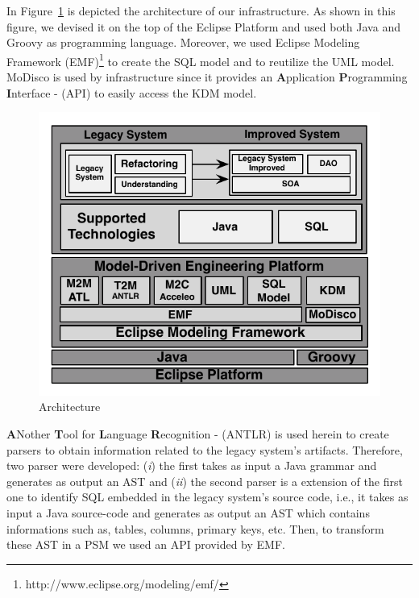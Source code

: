 
In Figure~\ref{fig:architecture} is depicted the architecture of our infrastructure. As shown in this figure, we devised it on the top of the Eclipse Platform and used both Java and Groovy as programming language. Moreover, we used Eclipse Modeling Framework (EMF)\footnote{http://www.eclipse.org/modeling/emf/} to create the SQL model and to reutilize the UML model. MoDisco is used by infrastructure since it provides an
\textbf{A}pplication \textbf{P}rogramming \textbf{I}nterface - (API) to easily access the KDM model. 

\begin{figure}[!h]
\centering
 \includegraphics[scale=0.8]{Figuras/Arquitetura_da_Ferramenta}
\caption{Architecture}
\label{fig:architecture}
\end{figure}



\textbf{A}Nother \textbf{T}ool for \textbf{L}anguage \textbf{R}ecognition -  (ANTLR) is used herein to create parsers to obtain information related to the legacy system's artifacts. Therefore, two parser were developed: (\textit{i}) the first takes as input a Java grammar and generates as output an AST and (\textit{ii}) the second parser is a extension of the first one to identify SQL embedded in the legacy system's source code, i.e., it takes as input a Java source-code and generates as output an AST which contains informations such as, tables, columns, primary keys, etc. Then, to transform these AST in a PSM we used an API provided by EMF.
 

